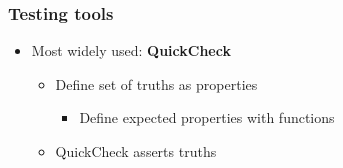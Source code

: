 \begin{frame}
  \frametitle{Testing tools}
  \begin{itemize}
    \item Most widely used: {\bf QuickCheck}
      \begin{itemize}
        \item Define set of truths as properties
			\begin{itemize}
			  \item Define expected properties with functions
			\end{itemize}
        \item QuickCheck asserts truths
      \end{itemize}
  \end{itemize}
\end{frame}